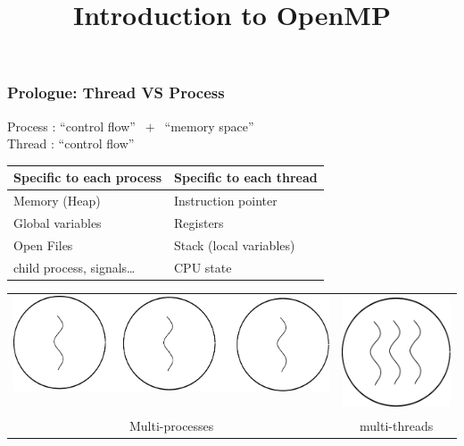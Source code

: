 \documentclass{beamer}
\title{Introduction to OpenMP}
\begin{document}
\begin{frame}
  \titlepage
\end{frame}
  

\begin{frame}
  \frametitle{Prologue: Thread VS Process}
  
  Process : ``control flow'' $~+~$ ``memory space'' \\
  Thread : ``control flow''
  
  \bigskip

  \begin{tabularx}{\textwidth}{X|X}
    Specific to each process & Specific to each thread \\
    \hline
    Memory (Heap)      & Instruction pointer  \\ 
    Global variables   & Registers \\
    Open Files         & Stack (local variables)\\
    child process, signals\dots & CPU state \\
  \end{tabularx}
  
  \bigskip

  \begin{tabularx}{\textwidth}{c|c}
    \includegraphics[height=0.2\textheight]{multi-processus}$\quad$&
    \includegraphics[height=0.2\textheight]{multi-thread}\\
    
    Multi-processes    &
    $\quad$ multi-threads $\quad$ \\
    
  \end{tabularx}
\end{frame}
\end{document}
